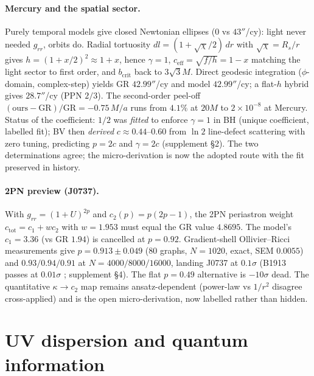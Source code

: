 \documentclass[11pt]{article}
\begin{document}
\paragraph{Mercury and the spatial sector.}
Purely temporal models give closed Newtonian ellipses ($0$ vs $43''$/cy):
light never needed $g_{rr}$, orbits do. Radial tortuosity
$dl = (1+\sqrt{\chi}/2)\,dr$ with $\sqrt{\chi} = R_s/r$ gives
$h = (1+x/2)^2 \approx 1+x$, hence $\gamma = 1$,
$c_{\mathrm{eff}} = \sqrt{f/h} = 1-x$ matching the light sector to first
order, and $b_{\mathrm{crit}}$ back to $3\sqrt{3}M$. Direct geodesic
integration ($\phi$-domain, complex-step) yields GR $42.99''$/cy and model
$42.99''$/cy; a flat-$h$ hybrid gives $28.7''$/cy (PPN $2/3$). The
second-order peel-off $(\mathrm{ours}-\mathrm{GR})/\mathrm{GR} = -0.75\,M/a$
runs from $4.1\%$ at $20M$ to $2\times 10^{-8}$ at Mercury. Status of the
coefficient: $1/2$ was \emph{fitted} to enforce $\gamma = 1$ in BH (unique
coefficient, labelled fit); BV then \emph{derived} $c \approx 0.44$--$0.60$
from $\ln 2$ line-defect scattering with zero tuning, predicting $p = 2c$
and $\gamma = 2c$ (supplement \S2). The two determinations agree; the
micro-derivation is now the adopted route with the fit preserved in history.

\paragraph{2PN preview (J0737).}
With $g_{rr} = (1+U)^{2p}$ and $c_2(p) = p(2p-1)$, the 2PN periastron weight
$c_{\mathrm{tot}} = c_1 + w c_2$ with $w = 1.953$ must equal the GR value
$4.8695$. The model's $c_1 = 3.36$ (vs GR $1.94$) is cancelled at $p = 0.92$.
Gradient-shell Ollivier--Ricci measurements give
$p = 0.913 \pm 0.049$ (80 graphs, $N = 1020$, exact, SEM $0.0055$) and
$0.93/0.94/0.91$ at $N = 4000/8000/16000$, landing J0737 \cite{Kramer2006} at $0.1\sigma$
(B1913 passes at $0.01\sigma$ \cite{Weisberg2016}; supplement \S4). The flat $p = 0.49$ alternative is $-10\sigma$ dead. The
quantitative $\kappa \to c_2$ map remains ansatz-dependent (power-law vs
$1/r^2$ disagree cross-applied) and is the open micro-derivation, now
labelled rather than hidden.

\section{UV dispersion and quantum information}
\label{sec:qi}
\end{document}
